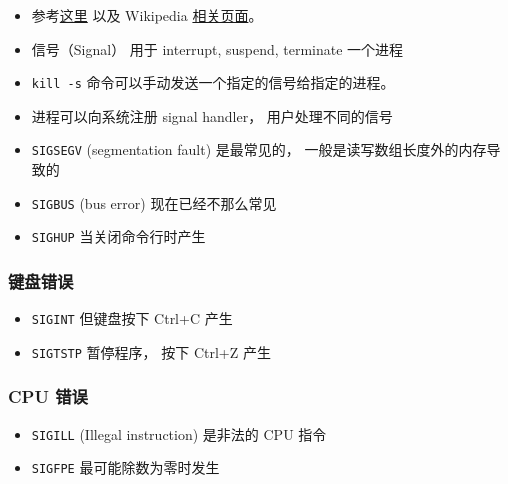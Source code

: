 
\begin{issues}
\issueDraft
\end{issues}

\begin{itemize}
\item 参考\href{https://unix.stackexchange.com/questions/6332/what-causes-various-signals-to-be-sent}{这里} 以及 Wikipedia \href{https://en.wikipedia.org/wiki/Signal_(IPC)}{相关页面}。
\item 信号（Signal） 用于 interrupt, suspend, terminate 一个进程
\item \verb|kill -s| 命令可以手动发送一个指定的信号给指定的进程。
\item 进程可以向系统注册 signal handler， 用户处理不同的信号
\item \verb|SIGSEGV| (segmentation fault) 是最常见的， 一般是读写数组长度外的内存导致的
\item \verb|SIGBUS| (bus error) 现在已经不那么常见
\item \verb|SIGHUP| 当关闭命令行时产生
\end{itemize}

\subsubsection{键盘错误}
\begin{itemize}
\item \verb|SIGINT| 但键盘按下 Ctrl+C 产生
\item \verb|SIGTSTP| 暂停程序， 按下 Ctrl+Z 产生
\end{itemize}

\subsubsection{CPU 错误}
\begin{itemize}
\item \verb|SIGILL| (Illegal instruction) 是非法的 CPU 指令
\item \verb|SIGFPE| 最可能除数为零时发生
\end{itemize}
